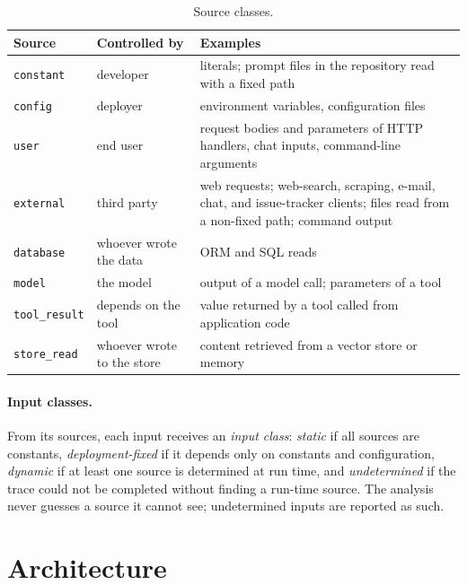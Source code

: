 \begin{table}[t]
\centering
\footnotesize
\renewcommand{\arraystretch}{1.2}
\setlength{\tabcolsep}{4pt}
\caption{Source classes.}
\label{tab:df-sources}
\begin{tabular}{@{}>{\raggedright\arraybackslash}p{}>{\raggedright\arraybackslash}p{}>{\raggedright\arraybackslash}p{}@{}}
\toprule
\textbf{Source} & \textbf{Controlled by} & \textbf{Examples} \\
\midrule
\texttt{constant} & developer & literals; prompt files in the repository read with a fixed path \\
\texttt{config} & deployer & environment variables, configuration files \\
\texttt{user} & end user & request bodies and parameters of HTTP handlers, chat inputs, command-line arguments \\
\texttt{external} & third party & web requests; web-search, scraping, e-mail, chat, and issue-tracker clients; files read from a non-fixed path; command output \\
\texttt{database} & whoever wrote the data & ORM and SQL reads \\
\midrule
\texttt{model} & the model & output of a model call; parameters of a tool \\
\texttt{tool\_result} & depends on the tool & value returned by a tool called from application code \\
\texttt{store\_read} & whoever wrote to the store & content retrieved from a vector store or memory \\
\bottomrule
\end{tabular}
\end{table}

\paragraph{Input classes.} From its sources, each input receives an \emph{input class}: \emph{static} if all sources are constants, \emph{deployment-fixed} if it depends only on constants and configuration, \emph{dynamic} if at least one source is determined at run time, and \emph{undetermined} if the trace could not be completed without finding a run-time source. The analysis never guesses a source it cannot see; undetermined inputs are reported as such.

\section{Architecture}
\label{sec:df-architecture}

